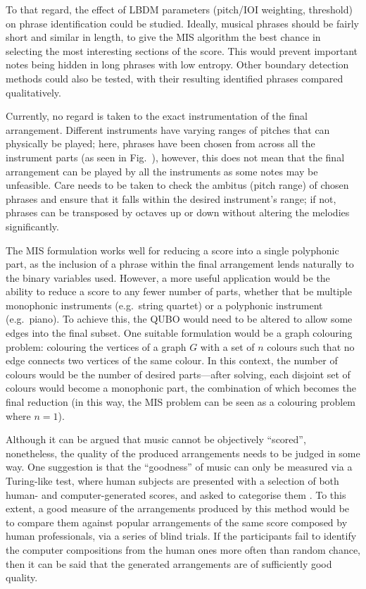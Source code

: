 \documentclass[12pt]{article}
\theoremstyle{definition}
\begin{document}
To that regard, the effect of LBDM parameters (pitch/IOI weighting, threshold) on phrase identification could be studied. Ideally, musical phrases should be fairly short and similar in length, to give the MIS algorithm the best chance in selecting the most interesting sections of the score. This would prevent important notes being hidden in long phrases with low entropy. Other boundary detection methods could also be tested, with their resulting identified phrases compared qualitatively.

Currently, no regard is taken to the exact instrumentation of the final arrangement. Different instruments have varying ranges of pitches that can physically be played; here, phrases have been chosen from across all the instrument parts (as seen in Fig.\  ), however, this does not mean that the final arrangement can be played by all the instruments as some notes may be unfeasible. Care needs to be taken to check the ambitus (pitch range) of chosen phrases and ensure that it falls within the desired instrument's range; if not, phrases can be transposed by octaves up or down without altering the melodies significantly.

The MIS formulation works well for reducing a score into a single polyphonic part, as the inclusion of a phrase within the final arrangement lends naturally to the binary variables used. However, a more useful application would be the ability to reduce a score to any fewer number of parts, whether that be multiple monophonic instruments (e.g.\ string quartet) or a polyphonic instrument (e.g.\ piano). To achieve this, the QUBO would need to be altered to allow some edges into the final subset. One suitable formulation would be a graph colouring problem: colouring the vertices of a graph $G$ with a set of $n$ colours such that no edge connects two vertices of the same colour. In this context, the number of colours would be the number of desired parts—after solving, each disjoint set of colours would become a monophonic part, the combination of which becomes the final reduction (in this way, the MIS problem can be seen as a colouring problem where $n=1$).

Although it can be argued that music cannot be objectively ``scored'', nonetheless, the quality of the produced arrangements needs to be judged in some way. One suggestion is that the ``goodness'' of music can only be measured via a Turing-like test, where human subjects are presented with a selection of both human- and computer-generated scores, and asked to categorise them . To this extent, a good measure of the arrangements produced by this method would be to compare them against popular arrangements of the same score composed by human professionals, via a series of blind trials. If the participants fail to identify the computer compositions from the human ones more often than random chance, then it can be said that the generated arrangements are of sufficiently good quality.
\end{document}
